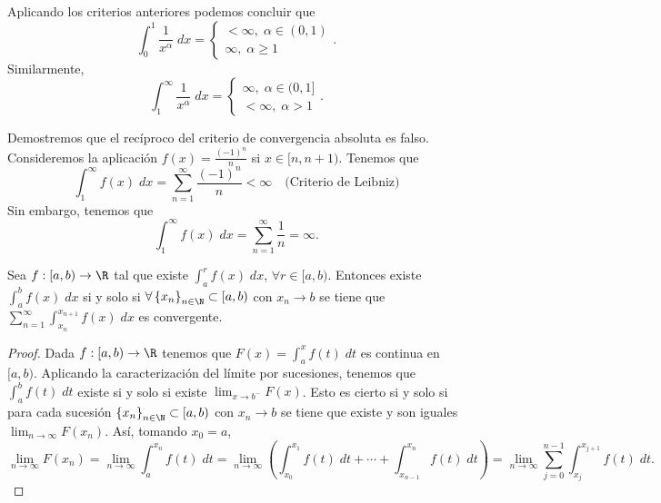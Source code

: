 \begin{observation}
\normalfont Aplicando los criterios anteriores podemos concluir que
\[\int^{1}_{0} \frac{1}{x^{\alpha }} \; dx = 
\begin{cases}
< \infty, \; \alpha \in \left(0,1\right) \\
\infty, \; \alpha \geq 1
\end{cases}
.\]
Similarmente, 
\[\int^{\infty}_{1} \frac{1}{x^{\alpha }} \; dx =
\begin{cases}
	\infty, \; \alpha \in (0,1] \\
	< \infty, \; \alpha > 1
\end{cases}
.\]
\end{observation}
\begin{eg}
\normalfont Demostremos que el recíproco del criterio de convergencia absoluta es falso. Consideremos la aplicación $\displaystyle f\left(x\right) = \frac{\left(-1\right)^{n}}{n} $ si $\displaystyle x \in [n,n+1) $. Tenemos que 
\[\int^{\infty}_{1} f\left(x\right) \; dx = \sum^{\infty}_{n = 1}\frac{\left(-1\right)^{n}}{n} < \infty \quad \text{(Criterio de Leibniz)} \]
Sin embargo, tenemos que 
\[\int^{\infty}_{1} f\left(x\right) \; dx = \sum^{\infty}_{n =1 }\frac{1}{n} = \infty .\]
\end{eg}
\begin{ftheorem}
	\normalfont Sea $\displaystyle f : [a,b) \to \R $ tal que existe $\displaystyle \int^{r}_{a} f\left(x\right) \; dx $, $\displaystyle \forall r \in [a,b) $. Entonces existe $\displaystyle \int^{b}_{a} f\left(x\right) \; dx  $ si y solo si $\displaystyle \forall \left\{ x_{n}\right\} _{n\in\N}\subset[a,b) $ con $\displaystyle x_{n} \to b $ se tiene que $\displaystyle \sum^{\infty}_{n=1}\int^{x_{n+1}}_{x_{n}} f\left(x\right) \; dx $ es convergente.
\end{ftheorem}
\begin{proof}
Dada $\displaystyle f : [a,b) \to \R $ tenemos que $\displaystyle F\left(x\right) = \int^{x}_{a} f\left(t\right) \; dt $ es continua en $\displaystyle [a,b) $. Aplicando la caracterización del límite por sucesiones, tenemos que $\displaystyle \int^{b}_{a} f\left(t\right) \; dt $ existe si y solo si existe $\displaystyle \lim_{x \to b^{-}}F\left(x\right) $.
Esto es cierto si y solo si para cada sucesión $\displaystyle \left\{ x_{n}\right\}_{n\in\N} \subset[a,b)  $ con $\displaystyle x_{n} \to b $ se tiene que existe y son iguales $\displaystyle \lim_{n \to \infty}F\left(x_{n}\right) $. Así, tomando $\displaystyle x_{0} = a $,
\[\lim_{n \to \infty}F\left(x_{n}\right) =  \lim_{n \to \infty}\int^{x_{n}}_{a} f\left(t\right) \; dt =  \lim_{n \to \infty}\left(\int^{x_{1}}_{x_{0}} f\left(t\right) \; dt + \cdots + \int^{x_{n}}_{x_{n-1}} f\left(t\right) \; dt\right) =\lim_{n \to \infty}\sum^{n-1}_{j=0}\int^{x_{j+1}}_{x_{j}} f\left(t\right) \; dt.\]
\end{proof}
